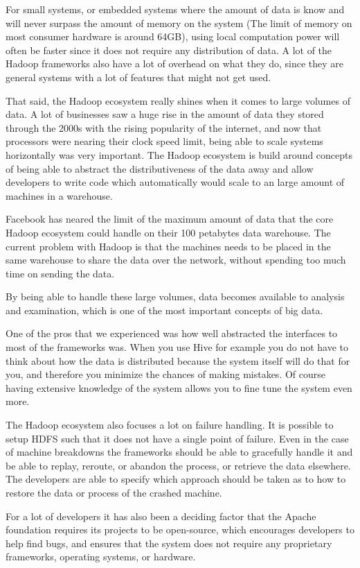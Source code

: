 \newpar For small systems, or embedded systems where the amount of data is know and will never surpass the amount of memory on the system (The limit of memory on most consumer hardware is around 64GB), using local computation power will often be faster since it does not require any distribution of data. A lot of the Hadoop frameworks also have a lot of overhead on what they do, since they are general systems with a lot of features that might not get used.

\newpar That said, the Hadoop ecosystem really shines when it comes to large volumes of data. A lot of businesses saw a huge rise in the amount of data they stored through the 2000s with the rising popularity of the internet, and now that processors were nearing their clock speed limit, being able to scale systems horizontally was very important. The Hadoop ecosystem is build around concepts of being able to abstract the distributiveness of the data away and allow developers to write code which automatically would scale to an large amount of machines in a warehouse. 

Facebook has neared the limit of the maximum amount of data that the core Hadoop ecosystem could handle on their 100 petabytes data warehouse. The current problem with Hadoop is that the machines needs to be placed in the same warehouse to share the data over the network, without spending too much time on sending the data\cite{limit-hadoop}.

By being able to handle these large volumes, data becomes available to analysis and examination, which is one of the most important concepts of big data.

\newpar One of the pros that we experienced was how well abstracted the interfaces to most of the frameworks was. When you use Hive for example you do not have to think about how the data is distributed because the system itself will do that for you, and therefore you minimize the chances of making mistakes. Of course having extensive knowledge of the system allows you to fine tune the system even more.

\newpar The Hadoop ecosystem also focuses a lot on failure handling. It is possible to setup HDFS such that it does not have a single point of failure. Even in the case of machine breakdowns the frameworks should be able to gracefully handle it and be able to replay, reroute, or abandon the process, or retrieve the data elsewhere. The developers are able to specify which approach should be taken as to how to restore the data or process of the crashed machine.

\newpar For a lot of developers it has also been a deciding factor that the Apache foundation requires its projects to be open-source, which encourages developers to help find bugs, and ensures that the system does not require any proprietary frameworks, operating systems, or hardware.
